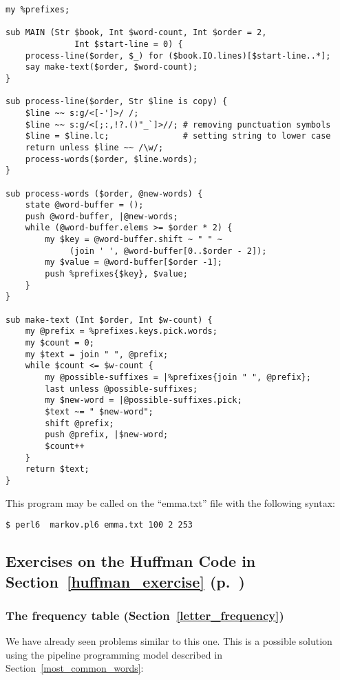 \begin{verbatim}
my %prefixes;

sub MAIN (Str $book, Int $word-count, Int $order = 2, 
              Int $start-line = 0) {
    process-line($order, $_) for ($book.IO.lines)[$start-line..*]; 
    say make-text($order, $word-count);
}

sub process-line($order, Str $line is copy) {
    $line ~~ s:g/<[-']>/ /; 
    $line ~~ s:g/<[;:,!?.()"_`]>//; # removing punctuation symbols
    $line = $line.lc;               # setting string to lower case
    return unless $line ~~ /\w/;
    process-words($order, $line.words);
}

sub process-words ($order, @new-words) {
    state @word-buffer = ();
    push @word-buffer, |@new-words;
    while (@word-buffer.elems >= $order * 2) {
        my $key = @word-buffer.shift ~ " " ~ 
             (join ' ', @word-buffer[0..$order - 2]);
        my $value = @word-buffer[$order -1];
        push %prefixes{$key}, $value;
    }
}

sub make-text (Int $order, Int $w-count) {
    my @prefix = %prefixes.keys.pick.words;
    my $count = 0;
    my $text = join " ", @prefix;
    while $count <= $w-count {
        my @possible-suffixes = |%prefixes{join " ", @prefix};
        last unless @possible-suffixes;
        my $new-word = |@possible-suffixes.pick;
        $text ~= " $new-word";
        shift @prefix;
        push @prefix, |$new-word;
        $count++
    }
    return $text;
}     
\end{verbatim}

This program may be called on the ``emma.txt'' file with 
the following syntax:

\begin{verbatim}
$ perl6  markov.pl6 emma.txt 100 2 253
\end{verbatim}

\subsection{Exercises on the Huffman Code in Section~\ref{huffman_exercise} (p.~\pageref{huffman_exercise})}

\subsubsection{The frequency table (Section~\ref{letter_frequency})}
\label{sol_letter_frequency}

We have already seen problems similar to this one. This 
is a possible solution using the pipeline programming model 
described in Section~\ref{most_common_words}:


